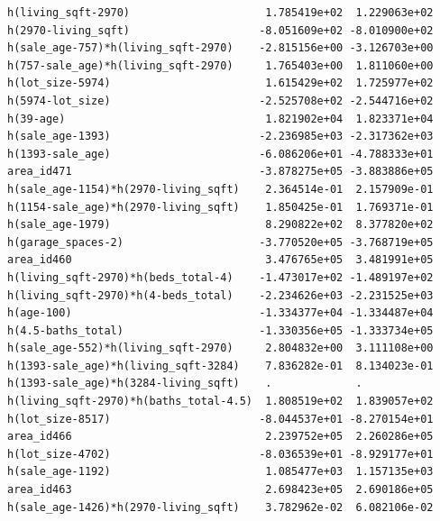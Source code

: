 \documentclass[
]{article}
\begin{document}
\begin{verbatim}
h(living_sqft-2970)                     1.785419e+02  1.229063e+02
h(2970-living_sqft)                    -8.051609e+02 -8.010900e+02
h(sale_age-757)*h(living_sqft-2970)    -2.815156e+00 -3.126703e+00
h(757-sale_age)*h(living_sqft-2970)     1.765403e+00  1.811060e+00
h(lot_size-5974)                        1.615429e+02  1.725977e+02
h(5974-lot_size)                       -2.525708e+02 -2.544716e+02
h(39-age)                               1.821902e+04  1.823371e+04
h(sale_age-1393)                       -2.236985e+03 -2.317362e+03
h(1393-sale_age)                       -6.086206e+01 -4.788333e+01
area_id471                             -3.878275e+05 -3.883886e+05
h(sale_age-1154)*h(2970-living_sqft)    2.364514e-01  2.157909e-01
h(1154-sale_age)*h(2970-living_sqft)    1.850425e-01  1.769371e-01
h(sale_age-1979)                        8.290822e+02  8.377820e+02
h(garage_spaces-2)                     -3.770520e+05 -3.768719e+05
area_id460                              3.476765e+05  3.481991e+05
h(living_sqft-2970)*h(beds_total-4)    -1.473017e+02 -1.489197e+02
h(living_sqft-2970)*h(4-beds_total)    -2.234626e+03 -2.231525e+03
h(age-100)                             -1.334377e+04 -1.334487e+04
h(4.5-baths_total)                     -1.330356e+05 -1.333734e+05
h(sale_age-552)*h(living_sqft-2970)     2.804832e+00  3.111108e+00
h(1393-sale_age)*h(living_sqft-3284)    7.836282e-01  8.134023e-01
h(1393-sale_age)*h(3284-living_sqft)    .             .           
h(living_sqft-2970)*h(baths_total-4.5)  1.808519e+02  1.839057e+02
h(lot_size-8517)                       -8.044537e+01 -8.270154e+01
area_id466                              2.239752e+05  2.260286e+05
h(lot_size-4702)                       -8.036539e+01 -8.929177e+01
h(sale_age-1192)                        1.085477e+03  1.157135e+03
area_id463                              2.698423e+05  2.690186e+05
h(sale_age-1426)*h(2970-living_sqft)    3.782962e-02  6.082106e-02
                                                                  

\end{verbatim}
\end{document}
